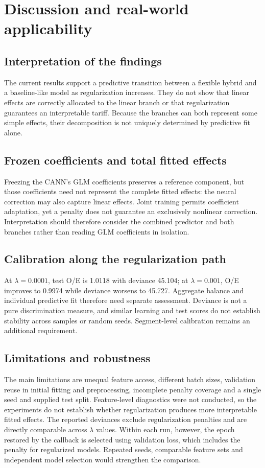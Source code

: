 \documentclass[a4paper]{article}
\begin{document}
\section{Discussion and real-world applicability}
\subsection{Interpretation of the findings}
The current results support a predictive transition between a flexible
hybrid and a baseline-like model as regularization increases.
They do not show that linear effects are correctly allocated to the
linear branch or that regularization guarantees an interpretable tariff.
Because the branches can both represent some simple effects, their
decomposition is not uniquely determined by predictive fit alone.

\subsection{Frozen coefficients and total fitted effects}
Freezing the CANN's GLM coefficients preserves a reference component,
but those coefficients need not represent the complete fitted effects:
the neural correction may also capture linear effects.
Joint training permits coefficient adaptation, yet a penalty does not
guarantee an exclusively nonlinear correction.
Interpretation should therefore consider the combined predictor and
both branches rather than reading GLM coefficients in isolation.

\subsection{Calibration along the regularization path}
At $\lambda=0.0001$, test O/E is 1.0118 with deviance 45.104;
at $\lambda=0.001$, O/E improves to 0.9974 while deviance worsens to 45.727.
Aggregate balance and individual predictive fit therefore need separate
assessment.
Deviance is not a pure discrimination measure, and similar learning and
test scores do not establish stability across samples or random seeds.
Segment-level calibration remains an additional requirement.

\subsection{Limitations and robustness}
The main limitations are unequal feature access, different batch sizes,
validation reuse in initial fitting and preprocessing, incomplete penalty
coverage and a single seed and supplied test split.
Feature-level diagnostics were not conducted, so the experiments do not
establish whether regularization produces more interpretable fitted effects.
The reported deviances exclude regularization penalties and are directly
comparable across $\lambda$ values.
Within each run, however, the epoch restored by the callback is selected
using validation loss, which includes the penalty for regularized models.
Repeated seeds, comparable feature sets and independent model selection
would strengthen the comparison.
\end{document}
